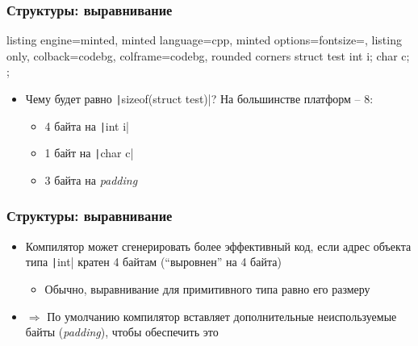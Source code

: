 \documentclass[10pt]{beamer}
\begin{document}
\begin{frame}[fragile]
\frametitle{Структуры: выравнивание}
\begin{tcblisting}{listing engine=minted, minted language=cpp, minted options={fontsize=\scriptsize}, listing only, colback=codebg, colframe=codebg, rounded corners}
struct test {
  int i;
  char c;
};
\end{tcblisting}
\pause
{}
\begin{itemize}
\item Чему будет равно \texttt|sizeof(struct test)|? \pause На большинстве платформ -- 8:
\begin{itemize}
\item 4 байта на \texttt|int i|
\item 1 байт на \texttt|char c|
\item 3 байта на \textit{padding}
\end{itemize}
\end{itemize}
\end{frame}

\begin{frame}[fragile]
\frametitle{Структуры: выравнивание}
\begin{itemize}
\item Компилятор может сгенерировать более эффективный код, если адрес объекта типа \texttt|int| кратен 4 байтам (``выровнен'' на 4 байта)
\pause
\begin{itemize}
\item Обычно, выравнивание для примитивного типа равно его размеру
\end{itemize}
\pause
\item \(\Longrightarrow\) По умолчанию компилятор вставляет дополнительные неиспользуемые байты (\textit{padding}), чтобы обеспечить это
\end{itemize}
\end{frame}
\end{document}
